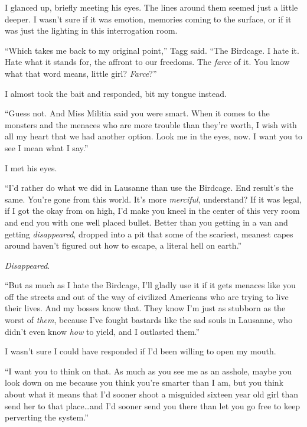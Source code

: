 I glanced up, briefly meeting his eyes.  The lines around them seemed just a little deeper.  I wasn't sure if it was emotion, memories coming to the surface, or if it was just the lighting in this interrogation room.



``Which takes me back to my original point,'' Tagg said.  ``The Birdcage.  I hate it.  Hate what it stands for, the affront to our freedoms.  The \emph{farce} of it.  You know what that word means, little girl?  \emph{Farce}?''



I almost took the bait and responded, bit my tongue instead.



``Guess not.  And Miss Militia said you were smart.  When it comes to the monsters and the menaces who are more trouble than they're worth, I wish with all my heart that we had another option.  Look me in the eyes, now.  I want you to see I mean what I say.''



I met his eyes.



``I'd rather do what we did in Lausanne than use the Birdcage.  End result's the same.  You're gone from this world.  It's more \emph{merciful}, understand?  If it was legal, if I got the okay from on high, I'd make you kneel in the center of this very room and end you with one well placed bullet.  Better than you getting in a van and getting \emph{disappeared}, dropped into a pit that some of the scariest, meanest capes around haven't figured out how to escape, a literal hell on earth.''



\emph{Disappeared}.



``But as much as I hate the Birdcage, I'll gladly use it if it gets menaces like you off the streets and out of the way of civilized Americans who are trying to live their lives.  And my bosses know that.  They know I'm just as stubborn as the worst of \emph{them}, because I've fought bastards like the sad souls in Lausanne, who didn't even know \emph{how }to yield, and I outlasted them.''



I wasn't sure I could have responded if I'd been willing to open my mouth.



``I want you to think on that.  As much as you see me as an asshole, maybe you look down on me because you think you're smarter than I am, but you think about what it means that I'd sooner shoot a misguided sixteen year old girl than send her to that place\ldots and I'd sooner send you there than let you go free to keep perverting the system.''



